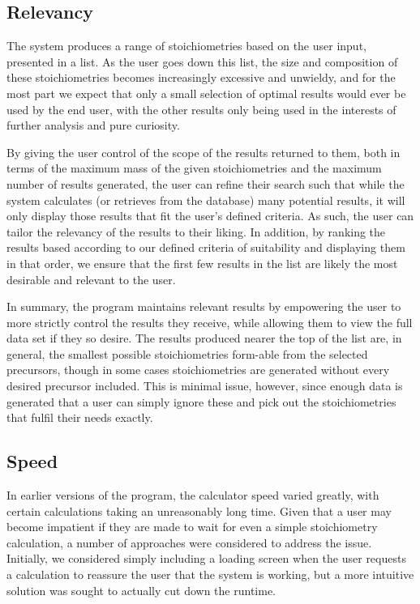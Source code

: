 \subsection{Relevancy}
The system produces a range of stoichiometries based on the user input, presented in a list. As the user goes down this list, the size and composition of these stoichiometries becomes increasingly excessive and unwieldy, and for the most part we expect that only a small selection of optimal results would ever be used by the end user, with the other results only being used in the interests of further analysis and pure curiosity.

By giving the user control of the scope of the results returned to them, both in terms of the maximum mass of the given stoichiometries and the maximum number of results generated, the user can refine their search such that while the system calculates (or retrieves from the database) many potential results, it will only display those results that fit the user’s defined criteria. As such, the user can tailor the relevancy of the results to their liking. In addition, by ranking the results based according to our defined criteria of suitability and displaying them in that order, we ensure that the first few results in the list are likely the most desirable and relevant to the user.

In summary, the program maintains relevant results by empowering the user to more strictly control the results they receive, while allowing them to view the full data set if they so desire. The results produced nearer the top of the list are, in general, the smallest possible stoichiometries form-able from the selected precursors, though in some cases stoichiometries are generated without every desired precursor included. This is minimal issue, however, since enough data is generated that a user can simply ignore these and pick out the stoichiometries that fulfil their needs exactly.

\subsection{Speed}
In earlier versions of the program, the calculator speed varied greatly, with certain calculations taking an unreasonably long time. Given that a user may become impatient if they are made to wait for even a simple stoichiometry calculation, a number of approaches were considered to address the issue. Initially, we considered simply including a loading screen when the user requests a calculation to reassure the user that the system is working, but a more intuitive solution was sought to actually cut down the runtime.

